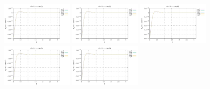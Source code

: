 \noindent
\includegraphics[width=3.5cm]{python_codes/fieldstone_152/RESULTS/exp2/err_32_m2}
\includegraphics[width=3.5cm]{python_codes/fieldstone_152/RESULTS/exp2/err_32_m3}
\includegraphics[width=3.5cm]{python_codes/fieldstone_152/RESULTS/exp2/err_32_m4}
\includegraphics[width=3.5cm]{python_codes/fieldstone_152/RESULTS/exp2/err_32_m5}
\includegraphics[width=3.5cm]{python_codes/fieldstone_152/RESULTS/exp2/err_32_m6}


